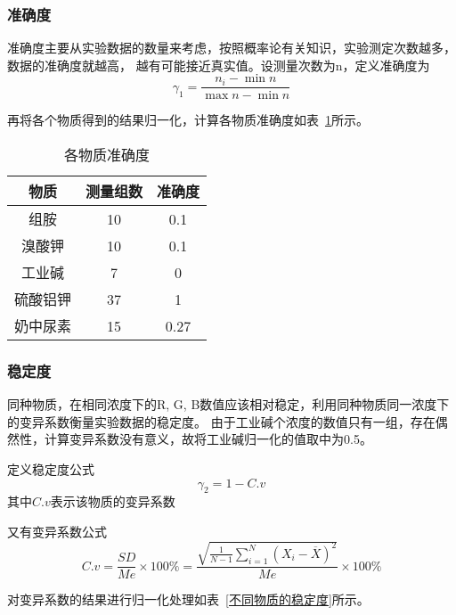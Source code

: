     \subsubsection{准确度}
    准确度主要从实验数据的数量来考虑，按照概率论有关知识，实验测定次数越多，数据的准确度就越高，
    越有可能接近真实值。设测量次数为n，定义准确度为
    $$\gamma_1=\frac{n_i -\min n}{\max n-\min n}$$
    
    
    再将各个物质得到的结果归一化，计算各物质准确度如表~\ref{各物质准确度}所示。
    
    \begin{table}[H]
      \centering
      \caption{各物质准确度}
      \label{各物质准确度}
      \begin{tabular}{@{}ccc@{}}
      \toprule
      物质 & 测量组数  & 准确度 \\ \midrule
      组胺 & 10 & 0.1   \\    \bottomrule
      溴酸钾 & 10 & 0.1  \\    \bottomrule
      工业碱 & 7 & 0     \\      \bottomrule
      硫酸铝钾 & 37 & 1   \\     \bottomrule
      奶中尿素 & 15 & 0.27 \\    \bottomrule
      \end{tabular}
    \end{table}
    
    \subsubsection{稳定度}
    同种物质，在相同浓度下的R, G, B数值应该相对稳定，利用同种物质同一浓度下的变异系数衡量实验数据的稳定度。
    由于工业碱个浓度的数值只有一组，存在偶然性，计算变异系数没有意义，故将工业碱归一化的值取中为0.5。

    定义稳定度公式
    $$\gamma_2=1-C.v$$
    其中$C.v$表示该物质的变异系数

    又有变异系数公式
    $$C.v = \frac{SD}{Me} \times 100\% = 
    \frac{\sqrt{\frac{1}{N - 1} \sum_{i=1}^{N} (X_{i} - \overline{X})^2 }} {Me} \times 100\%$$

    对变异系数的结果进行归一化处理如表~\ref{不同物质的稳定度}所示。
    
